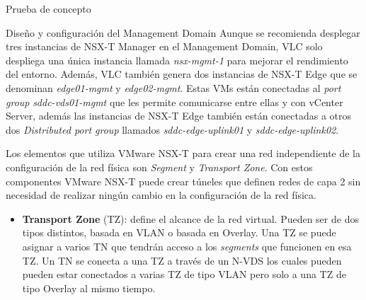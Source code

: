 \begin{section}{Prueba de concepto}
\begin{subsection}{Diseño y configuración del Management Domain}
    Aunque se recomienda desplegar tres instancias de NSX-T Manager en el Management Domain, VLC solo despliega una única instancia llamada \textit{nsx-mgmt-1} para mejorar el rendimiento del entorno. Además, VLC también genera dos instancias de NSX-T Edge que se denominan \textit{edge01-mgmt} y \textit{edge02-mgmt}. %
    Estas VMs están conectadas al \textit{port group} \textit{sddc-vds01-mgmt} que les permite comunicarse entre ellas y con vCenter Server, además las instancias de NSX-T Edge también están conectadas a otros dos \textit{Distributed port group} llamados \textit{sddc-edge-uplink01} y \textit{sddc-edge-uplink02}. %
    
    Los elementos que utiliza VMware NSX-T para crear una red independiente de la configuración de la red física son \textit{Segment} y \textit{Transport Zone}. Con estos componentes VMware NSX-T puede crear túneles que definen redes de capa 2 sin necesidad de realizar ningún cambio en la configuración de la red física.
    \begin{itemize}
      \item \textbf{Transport Zone} (TZ): define el alcance de la red virtual. Pueden ser de dos tipos distintos, basada en VLAN o basada en Overlay. Una TZ se puede asignar a varios TN que tendrán acceso a los \textit{segments} que funcionen en esa TZ. Un TN se conecta a una TZ a través de un N-VDS los cuales pueden pueden estar conectados a varias TZ de tipo VLAN pero solo a una TZ de tipo Overlay al mismo tiempo.
      

\end{itemize}
\end{subsection}
\end{section}
